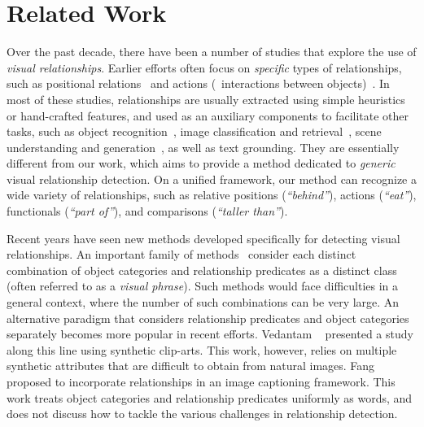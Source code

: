 \documentclass[10pt,twocolumn,letterpaper]{article}
\begin{document}
\section{Related Work}\label{sec:relwork}%

Over the past decade, there have been a number of studies that explore
the use of \emph{visual relationships}.
Earlier efforts often focus on \emph{specific} types of relationships, 
such as positional relations~\cite{gupta2008beyond, johnson2015image, galleguillos2008object, choi2013understanding, kulkarni2011baby, elliott2013image}
and actions (\ie~interactions between objects)~\cite{yao2010grouplet, gkioxari2015contextual, regneri2013grounding, thomason2014integrating, ramanathan2015learning, rohrbach2013translating, guadarrama2013youtube2text, antol2014zero, elhoseiny2015sherlock, farhadi2010every,xiong2015recognize}.
In most of these studies, relationships are usually extracted using simple 
heuristics or hand-crafted features, and used as 
an auxiliary components to facilitate other tasks, such as
object recognition~\cite{galleguillos2010context, sivic2005discovering, kumar2010efficiently, choi2010exploiting, ladicky2010graph, salakhutdinov2011learning, rabinovich2007objects, fidler2007towards, russell2006using},
image classification and retrieval~\cite{mensink2014costa, gong2014multi},
scene understanding and generation~\cite{zitnick2013learning, hoiem2008putting, chang2014semantic, yao2012describing, izadinia2014incorporating, gould2008multi, berg2012understanding},
as well as text grounding\cite{plummer2015flickr30k, karpathy2014deep, rohrbach2015grounding}.
They are essentially different from our work, which aims to provide a method
dedicated to \emph{generic} visual relationship detection.
On a unified framework, our method can recognize a wide variety of relationships, 
such as relative positions (\emph{``behind''}), actions (\emph{``eat''}), 
functionals (\emph{``part of''}), and comparisons (\emph{``taller than''}).

Recent years have seen new methods developed specifically for detecting visual relationships. 
An important family of methods~\cite{das2013thousand, divvala2014learning, sadeghi2011recognition}
consider each distinct combination of object categories and relationship predicates as
a distinct class (often referred to as a \emph{visual phrase}). 
Such methods would face difficulties in a general context, 
where the number of such combinations can be very large. 
An alternative paradigm that considers relationship predicates and object categories separately
becomes more popular in recent efforts. 
Vedantam \etal~\cite{vedantam2015learning} presented a study along this line
using synthetic clip-arts. This work, however, relies on multiple synthetic attributes
that are difficult to obtain from natural images. 
Fang \etal~\cite{fang2015captions} proposed to incorporate relationships in an image captioning
framework.
This work treats object categories and relationship predicates uniformly as words,
and does not discuss how to tackle the various challenges in relationship detection. 
\end{document}
